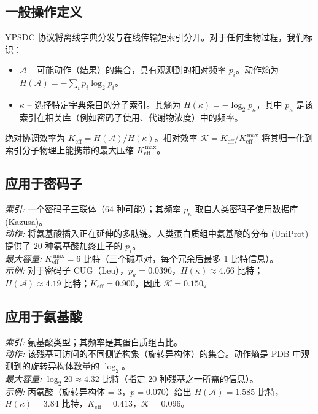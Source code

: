 \documentclass[12pt,a4paper]{article}
\newcommand{\REL}{\mathcal{K}}          %
\newcommand{\ABS}{K_{\mathrm{eff}}}     %
\begin{document}
	\subsection{一般操作定义}
	YPSDC 协议将离线字典分发与在线传输短索引分开。对于任何生物过程，我们标识：
	\begin{itemize}
		\item \(\mathcal{A}\) – 可能动作（结果）的集合，具有观测到的相对频率 \(p_i\)。动作熵为 \(H(\mathcal{A}) = -\sum_i p_i \log_2 p_i\)。
		\item \(\kappa\) – 选择特定字典条目的分子索引。其熵为 \(H(\kappa) = -\log_2 p_\kappa\)，其中 \(p_\kappa\) 是该索引在相关库（例如密码子使用、代谢物浓度）中的频率。
	\end{itemize}
	绝对协调效率为 \(\ABS = H(\mathcal{A})/H(\kappa)\)。相对效率 \(\REL = \ABS / \ABS^{\,\max}\) 将其归一化到索引分子物理上能携带的最大压缩 \(\ABS^{\,\max}\)。
	
	\subsection{应用于密码子}
	\textit{索引:} 一个密码子三联体（64 种可能）；其频率 \(p_\kappa\) 取自人类密码子使用数据库 (Kazusa)。\\
	\textit{动作:} 将氨基酸插入正在延伸的多肽链。人类蛋白质组中氨基酸的分布 (UniProt) 提供了 20 种氨基酸加终止子的 \(p_i\)。\\
	\textit{最大容量:} \(\ABS^{\,\max}=6\) 比特（三个碱基对，每个冗余后最多 1 比特信息）。\\
	\textit{示例:} 对于密码子 CUG（Leu），\(p_\kappa=0.0396\)，\(H(\kappa)\approx4.66\) 比特；\(H(\mathcal{A})\approx4.19\) 比特；\(\ABS=0.900\)，因此 \(\REL=0.150\)。
	
	\subsection{应用于氨基酸}
	\textit{索引:} 氨基酸类型；其频率是其蛋白质组占比。\\
	\textit{动作:} 该残基可访问的不同侧链构象（旋转异构体）的集合。动作熵是 PDB 中观测到的旋转异构体数量的 \(\log_2\)。\\
	\textit{最大容量:} \(\log_2 20 \approx 4.32\) 比特（指定 20 种残基之一所需的信息）。\\
	\textit{示例:} 丙氨酸（旋转异构体 = 3，\(p=0.070\)）给出 \(H(\mathcal{A})=1.585\) 比特，\(H(\kappa)=3.84\) 比特，\(\ABS=0.413\)，\(\REL=0.096\)。
	
\end{document}
